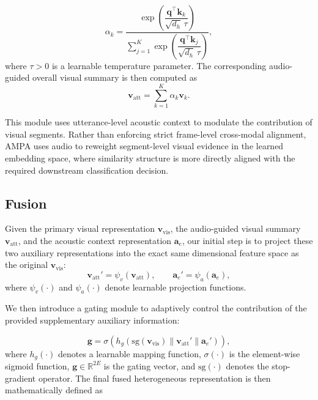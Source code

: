 \documentclass[sigconf,screen,review,anonymous]{acmart}
\begin{document}
\begin{equation}
\alpha_k=
\frac{
\exp\left(\dfrac{\mathbf{q}^{\top}\mathbf{k}_k}{\sqrt{d_h}\,\tau}\right)
}{
\sum_{j=1}^{K}
\exp\left(\dfrac{\mathbf{q}^{\top}\mathbf{k}_j}{\sqrt{d_h}\,\tau}\right)
},
\end{equation}
where $\tau>0$ is a learnable temperature parameter. The corresponding audio-guided overall visual summary is then computed as
\begin{equation}
\mathbf{v}_{\mathrm{att}} = \sum_{k=1}^{K} \alpha_k \mathbf{v}_k.
\end{equation}

This module uses utterance-level acoustic context to modulate the contribution of visual segments. Rather than enforcing strict frame-level cross-modal alignment, AMPA uses audio to reweight segment-level visual evidence in the learned embedding space, where similarity structure is more directly aligned with the required downstream classification decision.

\subsection{Fusion}

Given the primary visual representation $\mathbf{v}_{\mathrm{vis}}$, the audio-guided visual summary $\mathbf{v}_{\mathrm{att}}$, and the acoustic context representation $\mathbf{a}_e$, our initial step is to project these two auxiliary representations into the exact same dimensional feature space as the original $\mathbf{v}_{\mathrm{vis}}$:
\begin{equation}
\mathbf{v}_{\mathrm{att}}' = \psi_v(\mathbf{v}_{\mathrm{att}}), 
\qquad
\mathbf{a}_e' = \psi_a(\mathbf{a}_e),
\end{equation}
where $\psi_v(\cdot)$ and $\psi_a(\cdot)$ denote learnable projection functions.

We then introduce a gating module to adaptively control the contribution of the provided supplementary auxiliary information:

\begin{equation}
\mathbf{g}=
\sigma\!\left(
h_g\!\left(
\mathrm{sg}(\mathbf{v}_{\mathrm{vis}})
\parallel
\mathbf{v}_{\mathrm{att}}'
\parallel
\mathbf{a}_e'
\right)
\right),
\end{equation}
where $h_g(\cdot)$ denotes a learnable mapping function, $\sigma(\cdot)$ is the element-wise sigmoid function, $\mathbf{g}\in\mathbb{R}^{2E}$ is the gating vector, and $\mathrm{sg}(\cdot)$ denotes the stop-gradient operator. The final fused heterogeneous representation is then mathematically defined as
\end{document}
